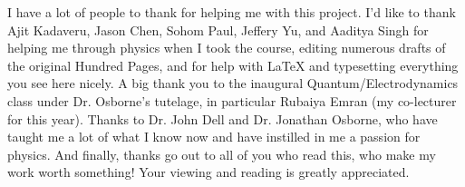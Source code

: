 I have a lot of people to thank for helping me with this project. I'd like to thank Ajit Kadaveru, Jason Chen, Sohom Paul, Jeffery Yu, and Aaditya Singh for helping me through physics when I took the course, editing numerous drafts of the original Hundred Pages, and for help with LaTeX and typesetting everything you see here nicely. A big thank you to the inaugural Quantum/Electrodynamics class under Dr. Osborne's tutelage, in particular Rubaiya Emran (my co-lecturer for this year). Thanks to Dr. John Dell and Dr. Jonathan Osborne, who have taught me a lot of what I know now and have instilled in me a passion for physics. And finally, thanks go out to all of you who read this, who make my work worth something! Your viewing and reading is greatly appreciated. 
\pagebreak